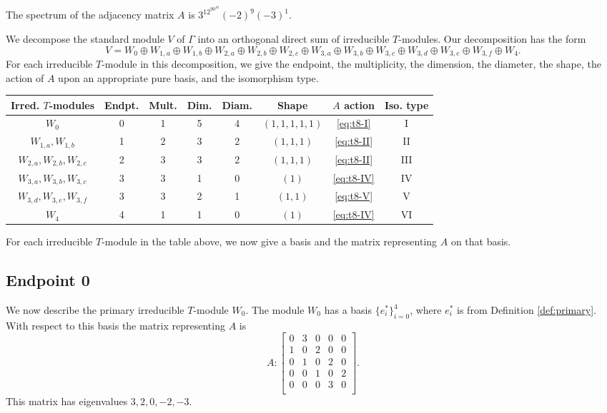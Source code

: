 \documentclass[12pt,letterpaper]{article}
\begin{document}
The spectrum of the adjacency matrix $A$ is $3^12^90^{10}(-2)^9(-3)^1$.

We decompose the standard module $V$ of $\Gamma$ into an orthogonal direct sum of irreducible $T$-modules. Our decomposition has the form
\[ V = W_0 \oplus W_{1,a} \oplus W_{1,b} \oplus W_{2,a} \oplus W_{2,b} \oplus W_{2,c} \oplus W_{3,a} \oplus W_{3,b} \oplus W_{3,c} \oplus W_{3,d} \oplus W_{3,e} \oplus W_{3,f} \oplus W_4. \]
For each irreducible $T$-module in this decomposition, we give the endpoint, the multiplicity, the dimension, the diameter, the shape, the action of $A$ upon an appropriate pure basis, and the isomorphism type.

\begin{center}
\begin{tabular}{c | c c c c c c c}
\toprule
\textbf{Irred. $T$-modules} & \textbf{Endpt.} & \textbf{Mult.} & \textbf{Dim.} & \textbf{Diam.} & \textbf{Shape} & $A$ \textbf{action} & \textbf{Iso. type} \\
\midrule
$W_0$ & 0 & 1 & 5 & 4 & $(1,1,1,1,1)$ & \eqref{eq:t8-I} & I \\
$W_{1,a}, W_{1,b}$ & 1 & 2 & 3 & 2 & $(1,1,1)$ & \eqref{eq:t8-II} & II \\
$W_{2,a}, W_{2,b}, W_{2,c}$ & 2 & 3 & 3 & 2 & $(1,1,1)$ & \eqref{eq:t8-II} & III \\
$W_{3,a}, W_{3,b}, W_{3,c}$ & 3 & 3 & 1 & 0 & $(1)$ & \eqref{eq:t8-IV} & IV \\
$W_{3,d}, W_{3,e}, W_{3,f}$ & 3 & 3 & 2 & 1 & $(1,1)$ & \eqref{eq:t8-V} & V \\
$W_{4}$ & 4 & 1 & 1 & 0 & $(1)$ & \eqref{eq:t8-IV} & VI \\
\bottomrule
\end{tabular}

\smallskip
{}
\end{center}

For each irreducible $T$-module in the table above, we now give a basis and the matrix representing $A$ on that basis.

\subsection{Endpoint 0}

We now describe the primary irreducible $T$-module $W_0$. The module $W_0$ has a basis $\{e_i^*\}_{i=0}^4$, where $e_i^*$ is from Definition \ref{def:primary}. With respect to this basis the matrix representing $A$ is
\begin{equation}
    A: \begin{bmatrix}
0 & 3 & 0 & 0 & 0 \\
1 & 0 & 2 & 0 & 0 \\
0 & 1 & 0 & 2 & 0 \\
0 & 0 & 1 & 0 & 2 \\
0 & 0 & 0 & 3 & 0 \\
\end{bmatrix}.
\label{eq:t8-I}
\end{equation}
This matrix has eigenvalues $3, 2, 0, -2, -3$.
\end{document}
